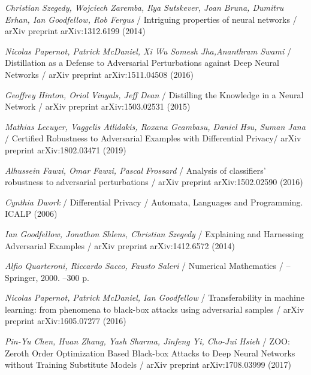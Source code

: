 \documentclass[14pt,a4paper]{extarticle}
\newcounter{e}
\numberwithin{equation}{section}
\numberwithin{figure}{section}
\begin{document}
 \newpage
 \thispagestyle{empty}
 \begin{thebibliography}{99}
	
	\textit{Christian Szegedy, Wojciech Zaremba, Ilya Sutskever, Joan Bruna, Dumitru Erhan, Ian Goodfellow, Rob Fergus} /
	Intriguing properties of neural networks /
	arXiv preprint arXiv:1312.6199 (2014)
	
	\textit{Nicolas Papernot, Patrick McDaniel, Xi Wu Somesh Jha,Ananthram Swami} /
	Distillation as a Defense to Adversarial Perturbations against Deep Neural Networks /
	arXiv preprint arXiv:1511.04508 (2016)
	
	\textit{Geoffrey Hinton, Oriol Vinyals, Jeff Dean} /
	Distilling the Knowledge in a Neural Network /
	arXiv preprint arXiv:1503.02531 (2015)
	
	\textit{Mathias Lecuyer, Vaggelis Atlidakis, Roxana Geambasu, Daniel Hsu, Suman Jana} /
	Certified Robustness to Adversarial Examples with Differential Privacy/
	arXiv preprint arXiv:1802.03471 (2019)
	
	\textit{Alhussein Fawzi, Omar Fawzi, Pascal Frossard} /
	Analysis of classifiers' robustness to adversarial perturbations /
	arXiv preprint arXiv:1502.02590 (2016)
	
	
	\textit{Cynthia Dwork} /
	Differential Privacy /
	Automata, Languages and Programming. ICALP (2006)
	
	\textit{Ian Goodfellow, Jonathon Shlens, Christian Szegedy} /
	Explaining and Harnessing Adversarial Examples /
	arXiv preprint arXiv:1412.6572 (2014)
	
	\textit{Alfio Quarteroni, Riccardo Sacco, Fausto Saleri} /
	Numerical Mathematics / --
	Springer, 2000. --300 p.
	
	\textit{Nicolas Papernot, Patrick McDaniel, Ian Goodfellow} /
	Transferability in machine learning: from phenomena to black-box attacks using adversarial samples /
	arXiv preprint arXiv:1605.07277 (2016)
	
	\textit{Pin-Yu Chen, Huan Zhang, Yash Sharma, Jinfeng Yi, Cho-Jui Hsieh} /
	ZOO: Zeroth Order Optimization Based Black-box Attacks to Deep Neural Networks without Training Substitute Models /
	arXiv preprint arXiv:1708.03999 (2017)
	

\end{thebibliography}
\end{document}
